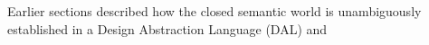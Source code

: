 Earlier sections described how the closed semantic world is unambiguously established in a Design Abstraction Language (DAL) and 